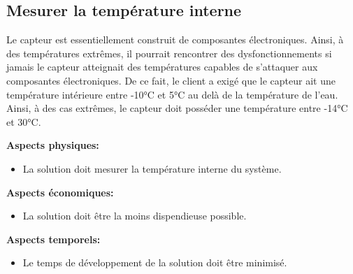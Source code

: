 \begin{table}[!htb]
\footnotesize
\centering
{}
\caption{Faisabilité des concepts pour mesurer la température externe}
\label{t:Decision_thermo_ext}
\end{table}


\subsection{Mesurer la température interne}
Le capteur est essentiellement construit de composantes électroniques. Ainsi, à des températures extrêmes, il pourrait rencontrer des dysfonctionnements si jamais le capteur atteignait des températures capables de s'attaquer aux composantes électroniques. De ce fait, le client a exigé que le capteur ait une température intérieure entre -10°C et 5°C au delà de la température de l'eau. Ainsi, à des cas extrêmes, le capteur doit posséder une température entre -14°C et 30°C.

\textbf{Aspects physiques:}
\begin{itemize}[label = {--}]
    \item La solution doit mesurer la température interne du système.
\end{itemize}

\textbf{Aspects économiques:}
\begin{itemize}[label = {--}]
    \item La solution doit être la moins dispendieuse possible.
\end{itemize}

\textbf{Aspects temporels:}
\begin{itemize}[label = {--}]
    \item Le temps de développement de la solution doit être minimisé.
\end{itemize}

